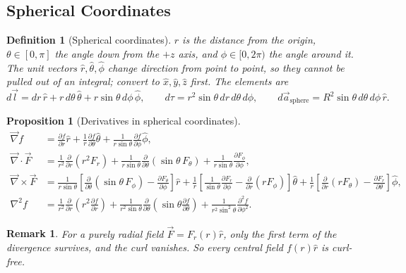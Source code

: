 \documentclass{article}
\newtheorem{definition}{Definition}
\newtheorem{remark}{Remark}
\newtheorem{proposition}{Proposition}
\begin{document}
\subsection{Spherical Coordinates}
\begin{definition}[Spherical coordinates]
    $r$ is the distance from the origin, $\theta\in[0,\pi]$ the angle down from the $+z$ axis, and $\phi\in[0,2\pi)$ the angle around it. The unit vectors $\hat{r},\hat{\theta},\hat{\phi}$ change direction from point to point, so they cannot be pulled out of an integral; convert to $\hat{x},\hat{y},\hat{z}$ first. The elements are
    \[d\vec{l} = dr\,\hat{r} + r\,d\theta\,\hat{\theta} + r\sin\theta\,d\phi\,\hat{\phi}, \qquad d\tau = r^2\sin\theta\,dr\,d\theta\,d\phi, \qquad d\vec{a}_{\text{sphere}} = R^2\sin\theta\,d\theta\,d\phi\,\hat{r}.\]
\end{definition}
\begin{proposition}[Derivatives in spherical coordinates]
    \begin{align*}
        \vec{\nabla}f &= \frac{\partial f}{\partial r}\hat{r} + \frac{1}{r}\frac{\partial f}{\partial \theta}\hat{\theta} + \frac{1}{r\sin\theta}\frac{\partial f}{\partial \phi}\hat{\phi},\\
        \vec{\nabla}\cdot\vec{F} &= \frac{1}{r^2}\frac{\partial}{\partial r}\left(r^2F_r\right) + \frac{1}{r\sin\theta}\frac{\partial}{\partial\theta}\left(\sin\theta\,F_\theta\right) + \frac{1}{r\sin\theta}\frac{\partial F_\phi}{\partial\phi},\\
        \vec{\nabla}\times\vec{F} &= \frac{1}{r\sin\theta}\left[\frac{\partial}{\partial\theta}(\sin\theta\,F_\phi) - \frac{\partial F_\theta}{\partial\phi}\right]\hat{r} + \frac{1}{r}\left[\frac{1}{\sin\theta}\frac{\partial F_r}{\partial\phi} - \frac{\partial}{\partial r}(rF_\phi)\right]\hat{\theta} + \frac{1}{r}\left[\frac{\partial}{\partial r}(rF_\theta) - \frac{\partial F_r}{\partial\theta}\right]\hat{\phi},\\
        \nabla^2 f &= \frac{1}{r^2}\frac{\partial}{\partial r}\left(r^2\frac{\partial f}{\partial r}\right) + \frac{1}{r^2\sin\theta}\frac{\partial}{\partial\theta}\left(\sin\theta\frac{\partial f}{\partial\theta}\right) + \frac{1}{r^2\sin^2\theta}\frac{\partial^2 f}{\partial\phi^2}.
    \end{align*}
\end{proposition}
\begin{remark}
    For a purely radial field $\vec{F} = F_r(r)\hat{r}$, only the first term of the divergence survives, and the curl vanishes. So every central field $f(r)\hat{r}$ is curl-free.
\end{remark}
\end{document}

